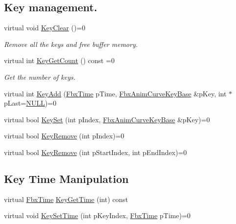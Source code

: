 \subsection*{Key management.}
\begin{DoxyCompactItemize}
\item 
virtual void \hyperlink{class_fbx_anim_curve_base_abe693d293087fad223770430ec79d65d}{Key\+Clear} ()=0
\begin{DoxyCompactList}\small\item\em Remove all the keys and free buffer memory. \end{DoxyCompactList}\item 
virtual int \hyperlink{class_fbx_anim_curve_base_a36fcc14d1c1944341da57085956a3f59}{Key\+Get\+Count} () const =0
\begin{DoxyCompactList}\small\item\em Get the number of keys. \end{DoxyCompactList}\item 
virtual int \hyperlink{class_fbx_anim_curve_base_a3e502968be213bd5cfde287f66f97cf5}{Key\+Add} (\hyperlink{class_fbx_time}{Fbx\+Time} p\+Time, \hyperlink{class_fbx_anim_curve_key_base}{Fbx\+Anim\+Curve\+Key\+Base} \&p\+Key, int $\ast$p\+Last=\hyperlink{fbxarch_8h_a070d2ce7b6bb7e5c05602aa8c308d0c4}{N\+U\+LL})=0
\item 
virtual bool \hyperlink{class_fbx_anim_curve_base_a1a66d683a6013b5eb41d128dcbbccd4a}{Key\+Set} (int p\+Index, \hyperlink{class_fbx_anim_curve_key_base}{Fbx\+Anim\+Curve\+Key\+Base} \&p\+Key)=0
\item 
virtual bool \hyperlink{class_fbx_anim_curve_base_a4d7d1bbd3d40020469aafd7c023f80d5}{Key\+Remove} (int p\+Index)=0
\item 
virtual bool \hyperlink{class_fbx_anim_curve_base_a2813321af80c66758eb9fbe025fd52ea}{Key\+Remove} (int p\+Start\+Index, int p\+End\+Index)=0
\end{DoxyCompactItemize}
\subsection*{Key Time Manipulation}
\begin{DoxyCompactItemize}
\item 
virtual \hyperlink{class_fbx_time}{Fbx\+Time} \hyperlink{class_fbx_anim_curve_base_a9db34dd56ce9822d0d6723ce7d50c4a3}{Key\+Get\+Time} (int) const
\item 
virtual void \hyperlink{class_fbx_anim_curve_base_afce0ede7336b9639c1e7ac08adf3e6df}{Key\+Set\+Time} (int p\+Key\+Index, \hyperlink{class_fbx_time}{Fbx\+Time} p\+Time)=0
\end{DoxyCompactItemize}
